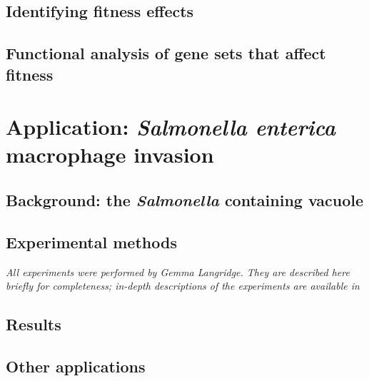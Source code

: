 \subsection{Identifying fitness effects}

\subsection{Functional analysis of gene sets that affect fitness}

\section{Application: \textit{Salmonella enterica} macrophage invasion}

\subsection{Background: the {\it Salmonella} containing vacuole}

\subsection{Experimental methods}

\textit{All experiments were performed by Gemma Langridge. They are described here briefly for completeness; in-depth descriptions of the experiments are available in \parencite{Langridge2010}}


\subsection{Results}

\subsection{Other applications}